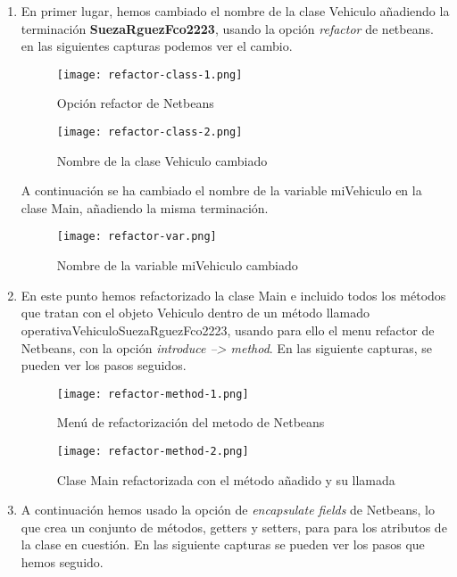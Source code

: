 \begin{enumerate}
    \item En primer lugar, hemos cambiado el nombre de la clase Vehiculo añadiendo la terminación \textbf{SuezaRguezFco2223}, usando la opción \textit{refactor} de netbeans. en las siguientes capturas podemos ver el cambio.

    \begin{figure}[H]
        \centering
        \texttt{[image: refactor-class-1.png]}
        \caption{Opción refactor de Netbeans}
    \end{figure}

    \begin{figure}[H]
        \centering
        \texttt{[image: refactor-class-2.png]}
        \caption{Nombre de la clase Vehiculo cambiado}
    \end{figure}

    A continuación se ha cambiado el nombre de la variable miVehiculo en la clase Main, añadiendo la misma terminación.

    \begin{figure}[ht]
        \centering
        \texttt{[image: refactor-var.png]}
        \caption{Nombre de la variable miVehiculo cambiado}
    \end{figure}


    \item En este punto hemos refactorizado la clase Main e incluido todos los métodos que tratan con el objeto Vehiculo dentro de un método llamado operativaVehiculoSuezaRguezFco2223, usando para ello el menu refactor de Netbeans, con la opción \textit{introduce --> method}. En las siguiente capturas, se pueden ver los pasos seguidos.

    \begin{figure}[H]
        \centering
        \texttt{[image: refactor-method-1.png]}
        \caption{Menú de refactorización del metodo de Netbeans}
    \end{figure}

    \begin{figure}[H]
        \centering
        \texttt{[image: refactor-method-2.png]}
        \caption{Clase Main refactorizada con el método añadido y su llamada}
    \end{figure}

    \item A continuación hemos usado la opción de \textit{encapsulate fields} de Netbeans, lo que crea un conjunto de métodos, getters y setters, para para los atributos de la clase en cuestión. En las siguiente capturas se pueden ver los pasos que hemos seguido.


\end{enumerate}
